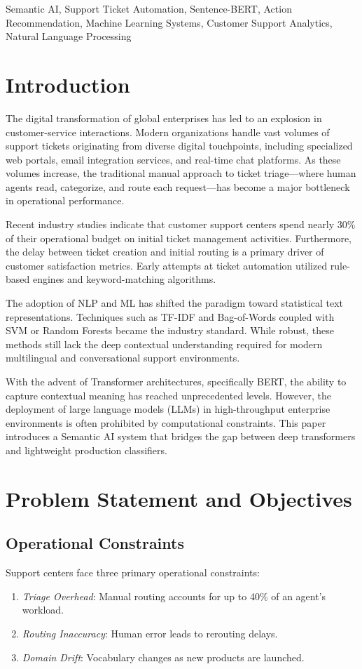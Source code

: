 \documentclass[conference]{IEEEtran}
\begin{document}
\begin{IEEEkeywords}
Semantic AI, Support Ticket Automation, Sentence-BERT, Action Recommendation, Machine Learning Systems, Customer Support Analytics, Natural Language Processing
\end{IEEEkeywords}

\section{Introduction}
The digital transformation of global enterprises has led to an explosion in customer-service interactions. Modern organizations handle vast volumes of support tickets originating from diverse digital touchpoints, including specialized web portals, email integration services, and real-time chat platforms. As these volumes increase, the traditional manual approach to ticket triage—where human agents read, categorize, and route each request—has become a major bottleneck in operational performance. 

Recent industry studies indicate that customer support centers spend nearly 30\% of their operational budget on initial ticket management activities. Furthermore, the delay between ticket creation and initial routing is a primary driver of customer satisfaction metrics. Early attempts at ticket automation utilized rule-based engines and keyword-matching algorithms. 

The adoption of NLP and ML has shifted the paradigm toward statistical text representations. Techniques such as TF-IDF and Bag-of-Words coupled with SVM or Random Forests became the industry standard. While robust, these methods still lack the deep contextual understanding required for modern multilingual and conversational support environments. 

With the advent of Transformer architectures, specifically BERT, the ability to capture contextual meaning has reached unprecedented levels. However, the deployment of large language models (LLMs) in high-throughput enterprise environments is often prohibited by computational constraints. This paper introduces a Semantic AI system that bridges the gap between deep transformers and lightweight production classifiers.

\section{Problem Statement and Objectives}

\subsection{Operational Constraints}
Support centers face three primary operational constraints:
\begin{enumerate}
\item \textit{Triage Overhead}: Manual routing accounts for up to 40\% of an agent's workload.
\item \textit{Routing Inaccuracy}: Human error leads to rerouting delays.
\item \textit{Domain Drift}: Vocabulary changes as new products are launched.
\end{enumerate}
\end{document}
